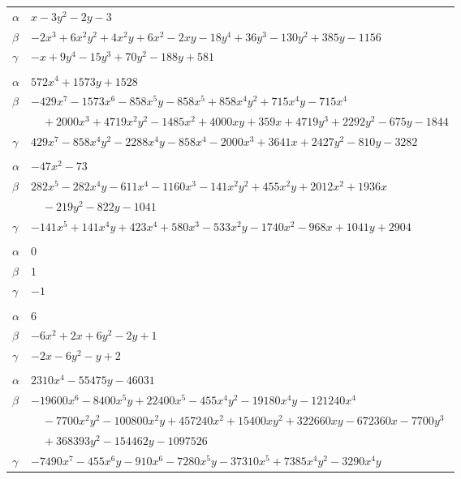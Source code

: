 \documentclass[11pt]{article}
\begin{document}
\begin{longtable}{@{}ll@{}}
$\alpha$ & $x-3y^{2}-2y-3$\\
$\beta$ & $-2x^{3}+6x^{2}y^{2}+4x^{2}y+6x^{2}-2xy-18y^{4}+36y^{3}-130y^{2}+385y-1156$\\
$\gamma$ & $-x+9y^{4}-15y^{3}+70y^{2}-188y+581$\\
\addlinespace[3pt]
\multicolumn{2}{@{}l}{$\{i,j\}=\{6,10\}$, $k_{ij}=2\cdot 3^{2}\cdot 5$}\\
$\alpha$ & $572x^{4}+1573y+1528$\\
$\beta$ & $-429x^{7}-1573x^{6}-858x^{5}y-858x^{5}+858x^{4}y^{2}+715x^{4}y-715x^{4}$\\
 & $\quad +2000x^{3}+4719x^{2}y^{2}-1485x^{2}+4000xy+359x+4719y^{3}+2292y^{2}-675y-1844$\\
$\gamma$ & $429x^{7}-858x^{4}y^{2}-2288x^{4}y-858x^{4}-2000x^{3}+3641x+2427y^{2}-810y-3282$\\
\addlinespace[3pt]
\multicolumn{2}{@{}l}{$\{i,j\}=\{6,11\}$, $k_{ij}=2^{5}\cdot 11^{2}$}\\
$\alpha$ & $-47x^{2}-73$\\
$\beta$ & $282x^{5}-282x^{4}y-611x^{4}-1160x^{3}-141x^{2}y^{2}+455x^{2}y+2012x^{2}+1936x$\\
 & $\quad -219y^{2}-822y-1041$\\
$\gamma$ & $-141x^{5}+141x^{4}y+423x^{4}+580x^{3}-533x^{2}y-1740x^{2}-968x+1041y+2904$\\
\addlinespace[3pt]
\multicolumn{2}{@{}l}{$\{i,j\}=\{7,9\}$, $k_{ij}=2$}\\
$\alpha$ & $0$\\
$\beta$ & $1$\\
$\gamma$ & $-1$\\
\addlinespace[3pt]
\multicolumn{2}{@{}l}{$\{i,j\}=\{7,14\}$, $k_{ij}=3^{2}$}\\
$\alpha$ & $6$\\
$\beta$ & $-6x^{2}+2x+6y^{2}-2y+1$\\
$\gamma$ & $-2x-6y^{2}-y+2$\\
\addlinespace[3pt]
\multicolumn{2}{@{}l}{$\{i,j\}=\{8,13\}$, $k_{ij}=3$}\\
$\alpha$ & $2310x^{4}-55475y-46031$\\
$\beta$ & $-19600x^{6}-8400x^{5}y+22400x^{5}-455x^{4}y^{2}-19180x^{4}y-121240x^{4}$\\
 & $\quad -7700x^{2}y^{2}-100800x^{2}y+457240x^{2}+15400xy^{2}+322660xy-672360x-7700y^{3}$\\
 & $\quad +368393y^{2}-154462y-1097526$\\
$\gamma$ & $-7490x^{7}-455x^{6}y-910x^{6}-7280x^{5}y-37310x^{5}+7385x^{4}y^{2}-3290x^{4}y$\\

\end{longtable}
\end{document}
